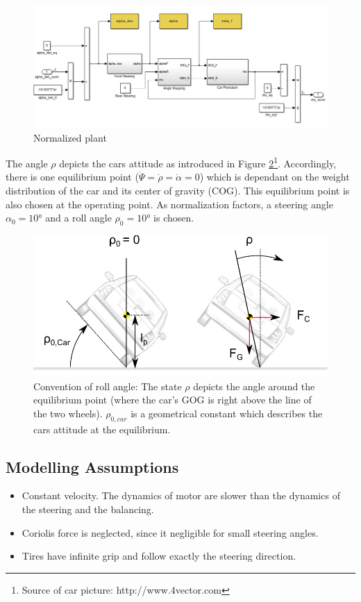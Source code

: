 \documentclass[conference]{IEEEtran}
\begin{document}
\begin{figure}[h]
\centering
  \includegraphics[width=.47\textwidth]{pics/P_car.png} 
  \caption{Normalized plant}  
  \label{figure:P_car}
\end{figure}

The angle $\rho$ depicts the cars attitude as introduced in Figure \ref{figure:car_from_back}\footnote{Source of car picture: http://www.4vector.com}. Accordingly, there is one equilibrium point ($\dot{\Psi} = \dot{\rho} = \dot{\alpha} = 0$) which is dependant on the weight distribution of the car and its center of gravity (COG). This equilibrium point is also chosen at the operating point. As normalization factors, a steering angle $\alpha_{0}=10°$ and a roll angle $\rho_{0}=10°$ is chosen.

\begin{figure}[h]
\centering
  \includegraphics[width=.47\textwidth]{pics/car_from_back} 
  \caption{Convention of roll angle: The state $\rho$ depicts the angle around the equilibrium point (where the car's GOG is right above the line of the two wheels). $\rho_{0,car}$ is a geometrical constant which describes the cars attitude at the equilibrium.}  
  \label{figure:car_from_back}
\end{figure}



\subsection{Modelling Assumptions}

\begin{itemize}
    \item Constant velocity. The dynamics of motor are slower than the dynamics of the steering and the balancing.
    \item Coriolis force is neglected, since it negligible for small steering angles.
    \item Tires have infinite grip and follow exactly the steering direction.
\end{itemize}
\end{document}

